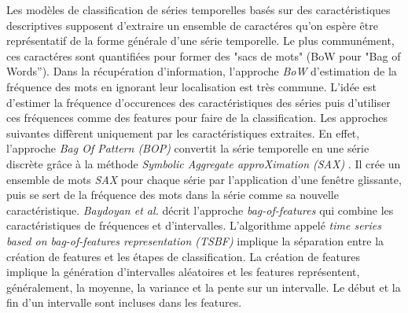 Les mod\`eles de classification de s\'eries temporelles bas\'es sur des caract\'eristiques
descriptives  supposent  d'extraire  un  ensemble  de  caract\'eres qu'on  esp\`ere  \^etre
repr\'esentatif de la forme g\'en\'erale d'une s\'erie temporelle. Le plus commun\'ement,
ces caract\'eres sont quantifi\'ees pour former des "sacs de mots" (BoW pour "Bag of Words'').
Dans la r\'ecup\'eration d'information, l'approche {\em BoW} d'estimation de la fr\'equence des mots en ignorant leur localisation est tr\`es commune. L'id\'ee est d'estimer la fr\'equence d'occurences des caract\'eristiques des s\'eries puis  d'utiliser ces fr\'equences comme des features pour faire de la  classification.
\newline
Les approches suivantes diff\`erent uniquement par les caract\'eristiques extraites.
En effet, l'approche {\em Bag Of Pattern (BOP)} \cite{lin2012rotation} convertit la s\'erie temporelle en une s\'erie discr\`ete gr\^ace \`a la m\'ethode {\em Symbolic Aggregate approXimation (SAX)} \cite{lin2007experiencing}. Il cr\'ee un ensemble de mots {\em SAX} pour chaque s\'erie par l'application d'une fen\^etre glissante, puis se sert de la fr\'equence des mots dans la s\'erie comme sa nouvelle caract\'eristique. 
{\em Baydoyan et al.} \cite{baydogan2013bag} d\'ecrit l'approche {\em bag-of-features} qui combine les caract\'eristiques de fr\'equences et d'intervalles. L'algorithme appel\'e {\em time series based on bag-of-features representation (TSBF)} implique la s\'eparation entre la cr\'eation de features et les \'etapes de classification. 
La cr\'eation de features implique la g\'en\'eration d'intervalles al\'eatoires et les features repr\'esentent, g\'en\'eralement, la moyenne, la variance et la pente sur un intervalle. 
Le d\'ebut et la fin d'un intervalle sont incluses dans les features. 